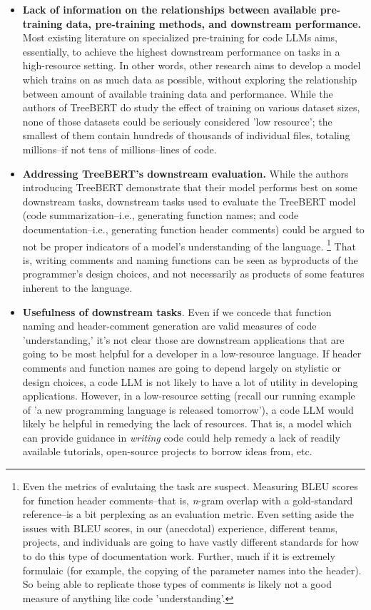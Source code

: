 \documentclass[acmlarge]{acmart}
\begin{document}
\begin{itemize}
    \item \textbf{Lack of information on the relationships between available pre-training data, pre-training methods, and downstream performance.} Most existing literature on specialized pre-training for code LLMs aims, essentially, to achieve the highest downstream performance on tasks in a high-resource setting. In other words, other research aims to develop a model which trains on as much data as possible, without exploring the relationship between amount of available training data and performance. While the authors of TreeBERT \cite{TreeBERT} do study the effect of training on various dataset sizes, none of those datasets could be seriously considered 'low resource'; the smallest of them contain hundreds of thousands of individual files, totaling millions--if not tens of millions--lines of code.
    \item \textbf{Addressing TreeBERT's downstream evaluation.} While the authors introducing TreeBERT demonstrate that their model performs best on some downstream tasks, downstream tasks used to evaluate the TreeBERT model (code summarization--i.e., generating function names; and code documentation--i.e., generating function header comments) could be argued to not be proper indicators of a model's understanding of the language.    \footnote{Even the metrics of evalutaing the task are suspect. Measuring BLEU scores for function header comments--that is, \emph{n}-gram overlap with a gold-standard reference--is a bit perplexing as an evaluation metric. Even setting aside the issues with BLEU scores, in our (anecdotal) experience, different teams, projects, and individuals are going to have vastly different standards for how to do this type of documentation work. Further, much if it is extremely formulaic (for example, the copying of the parameter names into the header). So being able to replicate those types of comments is likely not a good measure of anything like code 'understanding'.} That is, writing comments and naming functions can be seen as byproducts of the programmer's design choices, and not necessarily as products of some features inherent to the language.
    \item \textbf{Usefulness of downstream tasks}. Even if we concede that function naming and header-comment generation are valid measures of code 'understanding,' it's not clear those are downstream applications that are going to be most helpful for a developer in a low-resource language. If header comments and function names are going to depend largely on stylistic or design choices, a code LLM is not likely to have a lot of utility in developing applications. However, in a low-resource setting (recall our running example of 'a new programming language is released tomorrow'), a code LLM would likely be helpful in remedying the lack of resources. That is, a model which can provide guidance in \emph{writing} code could help remedy a lack of readily available tutorials, open-source projects to borrow ideas from, etc.
\end{itemize}
\end{document}
